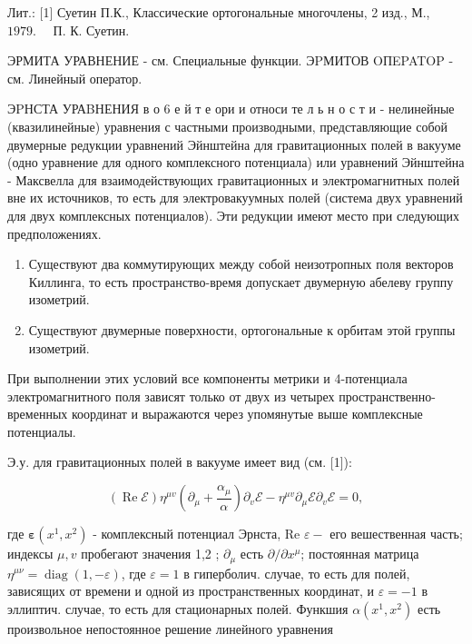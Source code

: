 \documentclass[10pt]{article}
\begin{document}
Лит.: [1] Суетин П.К., Классические ортогональные многочлены, 2 изд., М., $1979 . \quad$ П. К. Суетин.



ЭРМИТА УРАВНЕНИЕ - см. Специальные функции. ЭPМИТОВ OПEPATOP - см. Линейный оператор.



ЭPНСТА УРАBНЕНИЯ в о 6 е й т е ори и относи те л ь н о с т и - нелинейные (квазилинейные) уравнения с частными производными, представляющие собой двумерные редукции уравнений Эйнштейна для гравитационных полей в вакууме (одно уравнение для одного комплексного потенциала) или уравнений Эйнштейна - Максвелла для взаимодействующих гравитационных и электромагнитных полей вне их источников, то есть для электровакуумных полей (система двух уравнений для двух комплексных потенциалов). Эти редукции имеют место при следующих предположениях.



\begin{enumerate}

  \item Существуют два коммутирующих между собой неизотропных поля векторов Киллинга, то есть пространство-время допускает двумерную абелеву группу изометрий.



  \item Существуют двумерные поверхности, ортогональные к орбитам этой группы изометрий.



\end{enumerate}



При выполнении этих условий все компоненты метрики и 4-потенциала электромагнитного поля зависят только от двух из четырех пространственно-временных координат и выражаются через упомянутые выше комплексные потенциалы.



Э.у. для гравитационных полей в вакууме имеет вид (см. [1]):



\[

(\operatorname{Re} \mathscr{E}) \eta^{\mu v}\left(\partial_{\mu}+\frac{\alpha_{\mu}}{\alpha}\right) \partial_{v} \mathscr{E}-\eta^{\mu v} \partial_{\mu} \mathscr{E} \partial_{v} \mathscr{E}=0,

\]



где $\boldsymbol{\varepsilon}\left(x^{1}, x^{2}\right)$ - комплексный потенциал Эрнста, Re $\varepsilon-$ его вешественная часть; индексы $\mu, v$ пробегают значения 1,2 ; $\partial_{\mu}$ есть $\partial / \partial x^{\mu}$; постоянная матрица $\eta^{\mu \nu}=\operatorname{diag}(1,-\varepsilon)$, где $\varepsilon=1$ в гиперболич. случае, то есть для полей, зависящих от времени и одной из пространственных координат, и $\varepsilon=-1$ в эллиптич. случае, то есть для стационарных полей. Функшия $\alpha\left(x^{1}, x^{2}\right)$ есть произвольное непостоянное решение линейного уравнения
\end{document}
